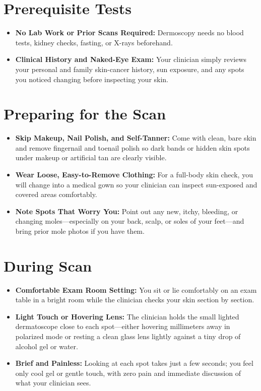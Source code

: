 \section{Prerequisite Tests}
\begin{itemize}
\item \textbf{No Lab Work or Prior Scans Required:} Dermoscopy needs no blood tests, kidney checks, fasting, or X-rays beforehand.
\item \textbf{Clinical History and Naked-Eye Exam:} Your clinician simply reviews your personal and family skin-cancer history, sun exposure, and any spots you noticed changing before inspecting your skin.
\end{itemize}

\section{Preparing for the Scan}
\begin{itemize}
\item \textbf{Skip Makeup, Nail Polish, and Self-Tanner:} Come with clean, bare skin and remove fingernail and toenail polish so dark bands or hidden skin spots under makeup or artificial tan are clearly visible.
\item \textbf{Wear Loose, Easy-to-Remove Clothing:} For a full-body skin check, you will change into a medical gown so your clinician can inspect sun-exposed and covered areas comfortably.
\item \textbf{Note Spots That Worry You:} Point out any new, itchy, bleeding, or changing moles---especially on your back, scalp, or soles of your feet---and bring prior mole photos if you have them.
\end{itemize}

\section{During Scan}
\begin{itemize}
\item \textbf{Comfortable Exam Room Setting:} You sit or lie comfortably on an exam table in a bright room while the clinician checks your skin section by section.
\item \textbf{Light Touch or Hovering Lens:} The clinician holds the small lighted dermatoscope close to each spot---either hovering millimeters away in polarized mode or resting a clean glass lens lightly against a tiny drop of alcohol gel or water.
\item \textbf{Brief and Painless:} Looking at each spot takes just a few seconds; you feel only cool gel or gentle touch, with zero pain and immediate discussion of what your clinician sees.
\end{itemize}

